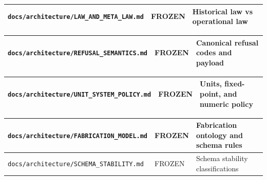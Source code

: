 \documentclass[9pt,a4paper,openany]{book}
\newcommand{\toprule}{\hline}
\newcommand{\midrule}{\hline}
\newcommand{\bottomrule}{\hline}
\begin{document}
\begin{center}
{\small\renewcommand{\arraystretch}{1.18}
\begin{tabularx}{\linewidth}{@{}>{\raggedright\arraybackslash}X >{\raggedright\arraybackslash}X >{\raggedright\arraybackslash}X@{}}
\toprule
\textbf{\texttt{docs/\allowbreak{}architecture/\allowbreak{}LAW\_\allowbreak{}AND\_\allowbreak{}META\_\allowbreak{}LAW.\allowbreak{}md}} & \textbf{FROZEN} & \textbf{Historical law vs operational law} \\
\midrule
\bottomrule
\end{tabularx}
}
\end{center}


\begin{center}
{\small\renewcommand{\arraystretch}{1.18}
\begin{tabularx}{\linewidth}{@{}>{\raggedright\arraybackslash}X >{\raggedright\arraybackslash}X >{\raggedright\arraybackslash}X@{}}
\toprule
\textbf{\texttt{docs/\allowbreak{}architecture/\allowbreak{}REFUSAL\_\allowbreak{}SEMANTICS.\allowbreak{}md}} & \textbf{FROZEN} & \textbf{Canonical refusal codes and payload} \\
\midrule
\bottomrule
\end{tabularx}
}
\end{center}


\begin{center}
{\small\renewcommand{\arraystretch}{1.18}
\begin{tabularx}{\linewidth}{@{}>{\raggedright\arraybackslash}X >{\raggedright\arraybackslash}X >{\raggedright\arraybackslash}X@{}}
\toprule
\textbf{\texttt{docs/\allowbreak{}architecture/\allowbreak{}UNIT\_\allowbreak{}SYSTEM\_\allowbreak{}POLICY.\allowbreak{}md}} & \textbf{FROZEN} & \textbf{Units, fixed-\allowbreak{}point, and numeric policy} \\
\midrule
\bottomrule
\end{tabularx}
}
\end{center}


\begin{center}
{\small\renewcommand{\arraystretch}{1.18}
\begin{tabularx}{\linewidth}{@{}>{\raggedright\arraybackslash}X >{\raggedright\arraybackslash}X >{\raggedright\arraybackslash}X@{}}
\toprule
\textbf{\texttt{docs/\allowbreak{}architecture/\allowbreak{}FABRICATION\_\allowbreak{}MODEL.\allowbreak{}md}} & \textbf{FROZEN} & \textbf{Fabrication ontology and schema rules} \\
\midrule
\texttt{docs/\allowbreak{}architecture/\allowbreak{}SCHEMA\_\allowbreak{}STABILITY.\allowbreak{}md} & FROZEN & Schema stability classifications \\
\bottomrule
\end{tabularx}
}
\end{center}
\end{document}
